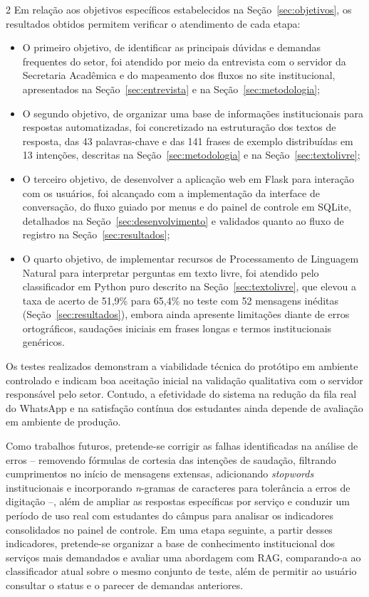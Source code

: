 \documentclass[10pt]{article}
\begin{document}
\begin{multicols}{2}
Em relação aos objetivos específicos estabelecidos na
Seção~\ref{sec:objetivos}, os resultados obtidos permitem verificar o
atendimento de cada etapa:
\begin{itemize}
  \item O primeiro objetivo, de identificar as principais dúvidas e
  demandas frequentes do setor, foi atendido por meio da entrevista com o
  servidor da Secretaria Acadêmica e do mapeamento dos fluxos no site
  institucional, apresentados na Seção~\ref{sec:entrevista} e na
  Seção~\ref{sec:metodologia};
  \item O segundo objetivo, de organizar uma base de informações
  institucionais para respostas automatizadas, foi concretizado na
  estruturação dos textos de resposta, das 43 palavras-chave e das 141
  frases de exemplo distribuídas em 13 intenções, descritas na
  Seção~\ref{sec:metodologia} e na Seção~\ref{sec:textolivre};
  \item O terceiro objetivo, de desenvolver a aplicação web em Flask para
  interação com os usuários, foi alcançado com a implementação da
  interface de conversação, do fluxo guiado por menus e do painel de
  controle em SQLite, detalhados na Seção~\ref{sec:desenvolvimento} e
  validados quanto ao fluxo de registro na Seção~\ref{sec:resultados};
  \item O quarto objetivo, de implementar recursos de Processamento de
  Linguagem Natural para interpretar perguntas em texto livre, foi
  atendido pelo classificador em Python puro descrito na
  Seção~\ref{sec:textolivre}, que elevou a taxa de acerto de 51,9\% para
  65,4\% no teste com 52 mensagens inéditas (Seção~\ref{sec:resultados}),
  embora ainda apresente limitações diante de erros ortográficos,
  saudações iniciais em frases longas e termos institucionais genéricos.
\end{itemize}

Os testes realizados demonstram a viabilidade técnica do protótipo em
ambiente controlado e indicam boa aceitação inicial na validação
qualitativa com o servidor responsável pelo setor. Contudo, a efetividade
do sistema na redução da fila real do WhatsApp e na satisfação contínua
dos estudantes ainda depende de avaliação em ambiente de produção.

Como trabalhos futuros, pretende-se corrigir as falhas identificadas na
análise de erros -- removendo fórmulas de cortesia das intenções de
saudação, filtrando cumprimentos no início de mensagens extensas,
adicionando \textit{stopwords} institucionais e incorporando \textit{n}-gramas de
caracteres para tolerância a erros de digitação --, além de ampliar as
respostas específicas por serviço e conduzir um período de uso real com
estudantes do câmpus para analisar os indicadores consolidados no painel de controle. Em uma etapa seguinte, a partir desses indicadores, pretende-se organizar a base de conhecimento institucional dos serviços mais demandados e avaliar uma abordagem com RAG, comparando-a ao classificador atual sobre o mesmo conjunto de teste, além de permitir ao usuário consultar o status e o parecer de demandas anteriores.


\end{multicols}
\end{document}
